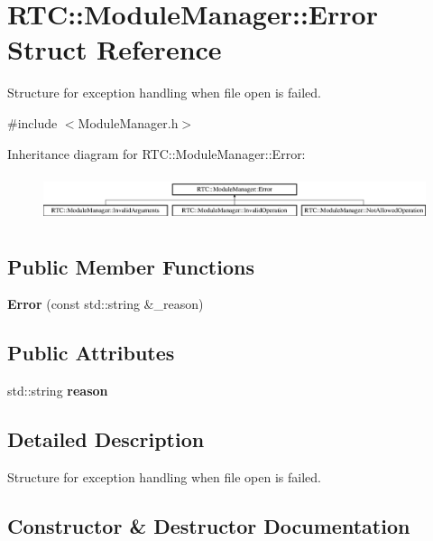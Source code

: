 \section{RTC::ModuleManager::Error Struct Reference}
\label{structRTC_1_1ModuleManager_1_1Error}


Structure for exception handling when file open is failed.  




{\ttfamily \#include $<$ModuleManager.h$>$}

Inheritance diagram for RTC::ModuleManager::Error:\begin{figure}[H]
\begin{center}
\leavevmode
\includegraphics[height=1.38786cm]{structRTC_1_1ModuleManager_1_1Error}
\end{center}
\end{figure}
\subsection*{Public Member Functions}
\begin{DoxyCompactItemize}
\item 
{\bf Error} (const std::string \&\_\-reason)
\end{DoxyCompactItemize}
\subsection*{Public Attributes}
\begin{DoxyCompactItemize}
\item 
std::string {\bf reason}
\end{DoxyCompactItemize}


\subsection{Detailed Description}
Structure for exception handling when file open is failed. 

\subsection{Constructor \& Destructor Documentation}
